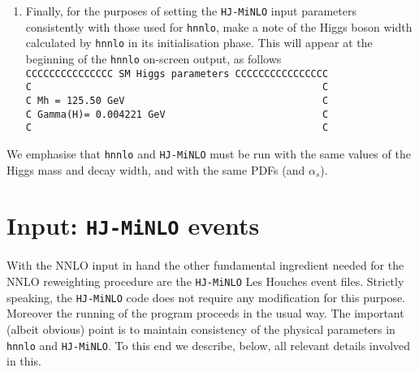 \documentclass[11pt,a4paper]{article}
\newcommand{\noun}[1]{{\tt #1}}
\newcommand{\HJMINLO}{\noun{HJ-MiNLO}}
\newcommand{\HNNLO}{\noun{hnnlo}}
\begin{document}
\begin{enumerate}
In order to produce the \HNNLO{} output for ref.~\cite{Hamilton:2013fea}, for each scale choice, 
we used  120M integration points for the grid preparation, 
and about 150-200 runs with 
240M points each for the integration stage. 

\item  Finally, for the purposes of setting the \HJMINLO{} input parameters
  consistently with those used for \HNNLO{}, make a note of the Higgs boson
  width calculated by \HNNLO{} in its initialisation phase. This will appear
  at the beginning of the \HNNLO{} on-screen output, as follows
\vspace{3mm}\\
{\tt{CCCCCCCCCCCCCCC SM Higgs parameters CCCCCCCCCCCCCCCC}}\\
{\tt{C \ \ \ \ \ \ \ \ \ \ \ \ \ \ \ \ \ \ \ \ \ \ \ \ \ \ \ \ \ \ \ \ \ \ \ \ \ \ \ \ \ \ \ \ \ \ \ \ \ C}}\\
{\tt{C   Mh      =  125.50 GeV\ \ \ \ \ \ \ \ \ \ \ \ \ \ \ \ \ \ \ \ \ \ \ \ \ \ \ \ \ \ \ \ \ \ C}}\\
{\tt{C   Gamma(H)= 0.004221 GeV\ \ \ \ \ \ \ \ \ \ \ \ \ \ \ \ \ \ \ \ \ \ \ \ \ \ \ C}}\\
{\tt{C \ \ \ \ \ \ \ \ \ \ \ \ \ \ \ \ \ \ \ \ \ \ \ \ \ \ \ \ \ \ \ \ \ \ \ \ \ \ \ \ \ \ \ \ \ \ \ \ \ C}}\\

\end{enumerate}

\noindent We emphasise that \HNNLO{} and \HJMINLO{} must be run with
the same values of the Higgs mass and decay width, and with the same
PDFs (and $\alpha_s$).

\section{Input: {\HJMINLO{}} events\label{sub:HJ-MINLO-ingredients}}
With the NNLO input in hand the other fundamental ingredient needed for the
NNLO reweighting procedure are the \HJMINLO{} Les Houches event files.
Strictly speaking, the \HJMINLO{} code does not require any
modification for this purpose. Moreover the running of the program proceeds
in the usual way. The important (albeit obvious) point is to maintain
consistency of the physical parameters in \HNNLO{} and \HJMINLO{}. To this
end we describe, below, all relevant details involved in this.
\end{document}
